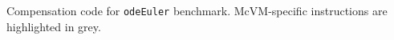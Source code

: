 \label{fig:comp-code} Compensation code for {\tt odeEuler} benchmark. McVM-specific instructions are highlighted in grey.%
